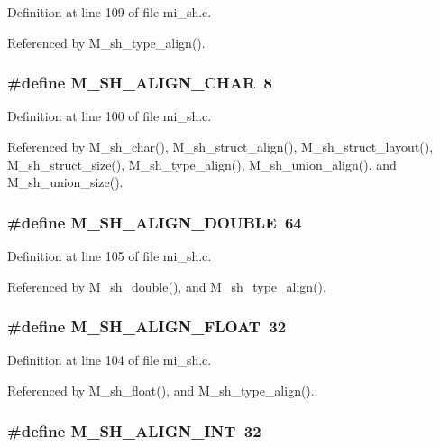 Definition at line 109 of file mi\_\-sh.c.

Referenced by M\_\-sh\_\-type\_\-align().
\subsubsection{\setlength{\rightskip}{0pt plus 5cm}\#define M\_\-SH\_\-ALIGN\_\-CHAR~8}\label{mi__sh_8c_9cf68cca329fc8d0e2fb3c1f1931e5ec}




Definition at line 100 of file mi\_\-sh.c.

Referenced by M\_\-sh\_\-char(), M\_\-sh\_\-struct\_\-align(), M\_\-sh\_\-struct\_\-layout(), M\_\-sh\_\-struct\_\-size(), M\_\-sh\_\-type\_\-align(), M\_\-sh\_\-union\_\-align(), and M\_\-sh\_\-union\_\-size().
\subsubsection{\setlength{\rightskip}{0pt plus 5cm}\#define M\_\-SH\_\-ALIGN\_\-DOUBLE~64}\label{mi__sh_8c_60953e49baa79004e5bb60abd25ddafe}




Definition at line 105 of file mi\_\-sh.c.

Referenced by M\_\-sh\_\-double(), and M\_\-sh\_\-type\_\-align().
\subsubsection{\setlength{\rightskip}{0pt plus 5cm}\#define M\_\-SH\_\-ALIGN\_\-FLOAT~32}\label{mi__sh_8c_287c4fcf703477d667fa674c928a87d3}




Definition at line 104 of file mi\_\-sh.c.

Referenced by M\_\-sh\_\-float(), and M\_\-sh\_\-type\_\-align().
\subsubsection{\setlength{\rightskip}{0pt plus 5cm}\#define M\_\-SH\_\-ALIGN\_\-INT~32}\label{mi__sh_8c_ea3738b9e691c593029340d04d6ef82d}




